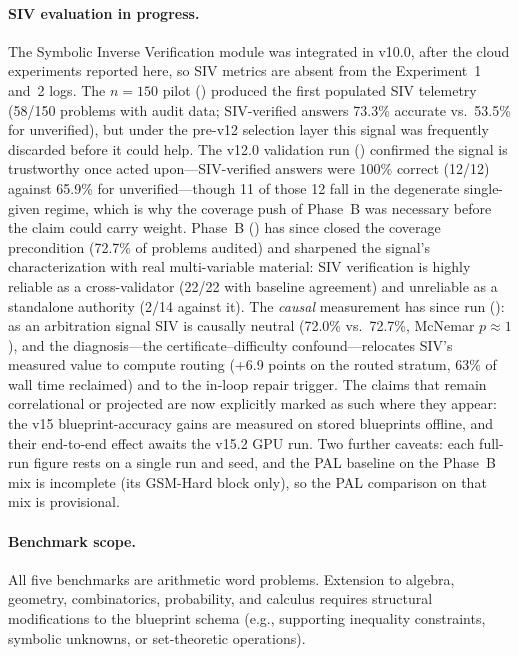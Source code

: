 \documentclass[11pt,a4paper]{article}
\begin{document}
\paragraph{SIV evaluation in progress.}
The Symbolic Inverse Verification module was integrated in v10.0, after the cloud experiments reported here, so SIV metrics are absent from the Experiment~1 and~2 logs.
The $n{=}150$ pilot () produced the first populated SIV telemetry (58/150 problems with audit data; SIV-verified answers 73.3\% accurate vs.\ 53.5\% for unverified), but under the pre-v12 selection layer this signal was frequently discarded before it could help.
The v12.0 validation run () confirmed the signal is trustworthy once acted upon---SIV-verified answers were 100\% correct (12/12) against 65.9\% for unverified---though 11 of those 12 fall in the degenerate single-given regime, which is why the coverage push of Phase~B was necessary before the claim could carry weight.
Phase~B () has since closed the coverage precondition (72.7\% of problems audited) and sharpened the signal's characterization with real multi-variable material: SIV verification is highly reliable as a cross-validator (22/22 with baseline agreement) and unreliable as a standalone authority (2/14 against it).
The \emph{causal} measurement has since run (): as an arbitration signal SIV is causally neutral (72.0\% vs.\ 72.7\%, McNemar $p{\approx}1$), and the diagnosis---the certificate--difficulty confound---relocates SIV's measured value to compute routing (+6.9 points on the routed stratum, 63\% of wall time reclaimed) and to the in-loop repair trigger.
The claims that remain correlational or projected are now explicitly marked as such where they appear: the v15 blueprint-accuracy gains are measured on stored blueprints offline, and their end-to-end effect awaits the v15.2 GPU run.
Two further caveats: each full-run figure rests on a single run and seed, and the PAL baseline on the Phase~B mix is incomplete (its GSM-Hard block only), so the PAL comparison on that mix is provisional.
\paragraph{Benchmark scope.}
All five benchmarks are arithmetic word problems.
Extension to algebra, geometry, combinatorics, probability, and calculus requires structural modifications to the blueprint schema (e.g., supporting inequality constraints, symbolic unknowns, or set-theoretic operations).
\end{document}
